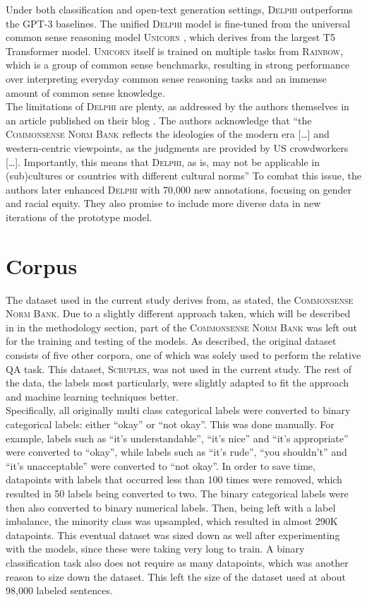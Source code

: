 \documentclass[final]{clv3} %
\begin{document}
Under both classification and open-text generation settings, \textsc{Delphi} outperforms the GPT-3 baselines. The unified \textsc{Delphi} model is fine-tuned from the universal common sense reasoning model \textsc{Unicorn} \cite{lourie}, which derives from the largest T5 Transformer model. \textsc{Unicorn} itself is trained on multiple tasks from \textsc{Rainbow}, which is a group of common sense benchmarks, resulting in strong performance over interpreting everyday common sense reasoning tasks and an immense amount of common sense knowledge.\\

The limitations of \textsc{Delphi} are plenty, as addressed by the authors themselves in an article published on their blog \cite{jiang-blog}. The authors acknowledge that “the \textsc{Commonsense Norm Bank} reflects the ideologies of the modern era […] and western-centric viewpoints, as the judgments are provided by US crowdworkers […]. Importantly, this means that \textsc{Delphi}, as is, may not be applicable in (sub)cultures or countries with different cultural norms” \cite{jiang-blog} To combat this issue, the authors later enhanced \textsc{Delphi} with 70,000 new annotations, focusing on gender and racial equity. They also promise to include more diverse data in new iterations of the prototype model. 

\section{Corpus}
The dataset used in the current study derives from, as stated, the \textsc{Commonsense Norm Bank}. Due to a slightly different approach taken, which will be described in in the methodology section, part of the \textsc{Commonsense Norm Bank} was left out for the training and testing of the models. As described, the original dataset consists of five other corpora, one of which was solely used to perform the relative QA task. This dataset, \textsc{Scruples}, was not used in the current study. The rest of the data, the labels most particularly, were slightly adapted to fit the approach and machine learning techniques better. \\

Specifically, all originally multi class categorical labels were converted to binary categorical labels: either “okay” or “not okay”. This was done manually. For example, labels such as “it’s understandable”, “it’s nice” and “it’s appropriate” were converted to “okay”, while labels such as “it’s rude”, “you shouldn’t” and “it’s unacceptable” were converted to “not okay”. In order to save time, datapoints with labels that occurred less than 100 times were removed, which resulted in 50 labels being converted to two. The binary categorical labels were then also converted to binary numerical labels. Then, being left with a label imbalance, the minority class was upsampled, which resulted in almost 290K datapoints. This eventual dataset was sized down as well after experimenting with the models, since these were taking very long to train. A binary classification task also does not require as many datapoints, which was another reason to size down the dataset. This left the size of the dataset used at about 98,000 labeled sentences.
\end{document}
